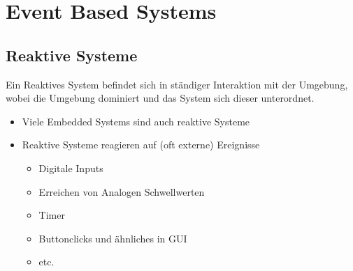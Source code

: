 \section{Event Based Systems }
\subsection{Reaktive Systeme }
Ein Reaktives System befindet sich in ständiger Interaktion mit der Umgebung, wobei die Umgebung dominiert und das System sich dieser unterordnet.
\begin{itemize}
	\item Viele Embedded Systems sind auch reaktive Systeme
	\item Reaktive Systeme reagieren auf (oft externe) Ereignisse
	\begin{itemize}
	\item Digitale Inputs
	\item Erreichen von Analogen Schwellwerten
	\item Timer
	\item Buttonclicks und ähnliches in GUI
	\item etc.
	\end{itemize}
\end{itemize}
